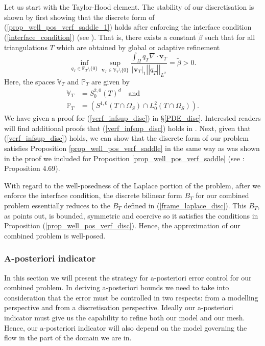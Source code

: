 \documentclass[12pt,a4paper]{article}
\theoremstyle{definition}
\begin{document}
  Let us start with the Taylor-Hood element.   The stability of our discretisation is shown by first showing that the discrete form  of (\ref{prop_well_pos_verf_saddle_1})  holds after enforcing the interface condition (\ref{interface_condition}) (see \cite[\S4.10.2]{verfurth2013posteriori}).  That is,  there exists a constant $\widetilde{\beta}$ such that for all triangulations $T$ which are obtained by global or adaptive refinement 
  \begin{equation}\label{verf_infsup_disc}
  \inf_{q_T\in \mathbb{P}_T\setminus \lbrace 0 \rbrace}\sup_{\textbf{v}_T\in \mathbb{V}_T\setminus \lbrace 0 \rbrace}\frac{\int_{\Omega}q_T\nabla\cdot\textbf{v}_T}{\left|\textbf{v}_T\right|_1 \left|\left|q_T\right|\right|_{L^2}}=\widetilde{\beta}>0.
  \end{equation}
 Here, the spaces $\mathbb{V}_T$ and $\mathbb{P}_T$ are given by 
 \begin{equation}
 \begin{aligned}
 \mathbb{V}_T&=S_0^{2,0}\left(T\right)^d\quad\text{and}\\
\mathbb{P}_T&=\left(S^{1,0}\left(T\cap\Omega_S\right)\cap L^2_0\left(T\cap\Omega_S\right)\right).
 \end{aligned}\nonumber
 \end{equation}
 We have given a proof for (\ref{verf_infsup_disc}) in \S \ref{PDE_disc}.  Interested readers will find additional proofs that (\ref{verf_infsup_disc}) holds in \cite{verfurth1984error}.  Next, given that (\ref{verf_infsup_disc}) holds, we can show that the discrete form of our problem satisfies Proposition \ref{prop_well_pos_verf_saddle} in the same way as was shown in the proof we included for Proposition \ref{prop_well_pos_verf_saddle} (see \cite[\S4.10.1]{verfurth2013posteriori}: Proposition 4.69).  
 
 With regard to the well-posedness of the Laplace portion of the problem, after we enforce the interface condition,  the discrete bilinear form $B_T$ for our combined problem essentially reduces to the $B_T$ defined in (\ref{frame_laplace_disc}). This $B_T$, as \cite{verfurth2013posteriori} points out, is bounded, symmetric and coercive so it satisfies the conditions in Proposition (\ref{prop_well_pos_verf_disc}).  Hence, the approximation of our combined problem is well-posed. 

\subsubsection{A-posteriori indicator}\label{a_posteriori_combined_prob}
In this section we will present the strategy for a-posteriori error control for our combined problem.  In deriving a-posteriori bounds we need to take into consideration that the error must be controlled in two respects: from a modelling perspective and from a discretisation perspective.  Ideally our a-posteriori indicator must give us the capability to refine both our model and our mesh.  Hence, our a-posteriori indicator will also depend on the model governing the flow in the part of the domain we are in.  
\end{document}

